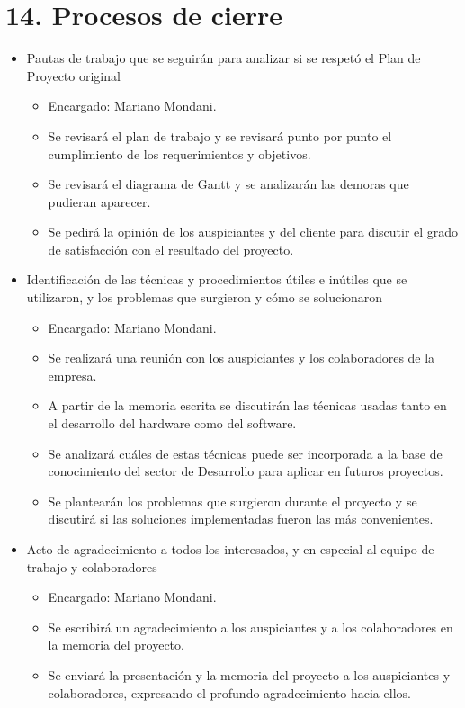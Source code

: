 \documentclass[
11pt, %
]{charter}
\begin{document}


\section{14. Procesos de cierre}    
\label{sec:cierre}


\begin{itemize}
	\item Pautas de trabajo que se seguirán para analizar si se respetó el Plan de Proyecto original
	\begin{itemize}
		\item Encargado: Mariano Mondani.
		\item Se revisará el plan de trabajo y se revisará punto por punto el cumplimiento de los
requerimientos y objetivos.
		\item Se revisará el diagrama de Gantt y se analizarán las demoras que pudieran aparecer.
		\item Se pedirá la opinión de los auspiciantes y del cliente para discutir el grado de
satisfacción con el resultado del proyecto.
	\end{itemize}
	
	\item Identificación de las técnicas y procedimientos útiles e inútiles que se utilizaron, y los problemas que surgieron y cómo se solucionaron
	\begin{itemize}
		\item Encargado: Mariano Mondani.
		\item Se realizará una reunión con los auspiciantes y los colaboradores de la empresa.
		\item A partir de la memoria escrita se discutirán las técnicas usadas tanto en el desarrollo del hardware como del software.
		\item Se analizará cuáles de estas técnicas puede ser incorporada a la base de conocimiento del sector de Desarrollo para aplicar en futuros proyectos.
		\item Se plantearán los problemas que surgieron durante el proyecto y se discutirá si las
soluciones implementadas fueron las más convenientes.
	\end{itemize}
	
	\item Acto de agradecimiento a todos los interesados, y en especial al equipo de trabajo y
colaboradores
	\begin{itemize}
		\item Encargado: Mariano Mondani.
		\item Se escribirá un agradecimiento a los auspiciantes y a los colaboradores en la memoria del proyecto.
		\item  Se enviará la presentación y la memoria del proyecto a los auspiciantes y
colaboradores, expresando el profundo agradecimiento hacia ellos.
	\end{itemize}
\end{itemize}

\end{document}
